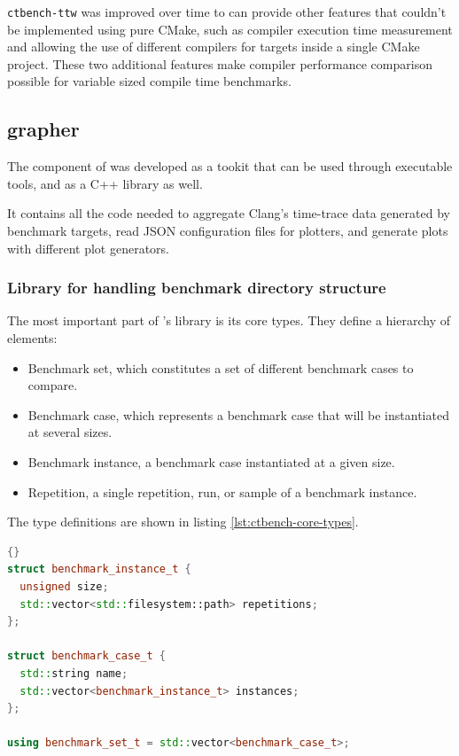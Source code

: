 \documentclass[../../main.tex]{subfiles}
\begin{document}
\lstinline{ctbench-ttw} was improved over time to can provide other features
that couldn't be implemented using pure CMake, such as compiler execution time
measurement and allowing the use of different compilers for targets inside a
single CMake project. These two additional features make compiler performance
comparison possible for variable sized compile time benchmarks.

\subsection{grapher}

The \grapher component of \ctbench was developed as a tookit that can be used
through executable tools, and as a C++ library as well.

It contains all the code needed to aggregate Clang's time-trace data generated
by \ctbench benchmark targets, read JSON configuration files for plotters, and
generate plots with different plot generators.

\subsubsection{Library for handling benchmark directory structure}

The most important part of \ctbench's \grapher library is its core types.
They define a hierarchy of elements:

\begin{itemize}
\item Benchmark set, which constitutes a set of different benchmark cases to
      compare.
\item Benchmark case, which represents a benchmark case that will be
      instantiated at several sizes.
\item Benchmark instance, a benchmark case instantiated at a given size.
\item Repetition, a single repetition, run, or sample of a benchmark instance.
\end{itemize}

The type definitions are shown in listing \ref{lst:ctbench-core-types}.

\begin{lstlisting}[language=C++, label=lst:ctbench-core-types]{}
struct benchmark_instance_t {
  unsigned size;
  std::vector<std::filesystem::path> repetitions;
};

struct benchmark_case_t {
  std::string name;
  std::vector<benchmark_instance_t> instances;
};

using benchmark_set_t = std::vector<benchmark_case_t>;
\end{lstlisting}
\end{document}
